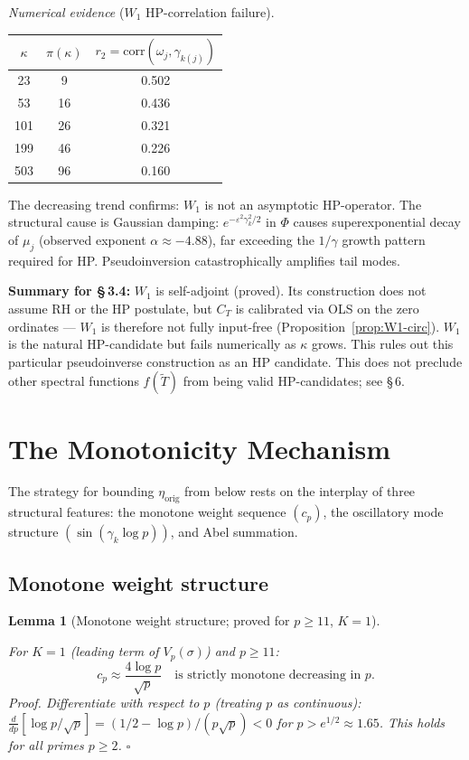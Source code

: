 \documentclass[11pt]{article}
\newtheorem{lemma}[theorem]{Lemma}
\newcommand{\etaorig}{\eta_{\mathrm{orig}}}
\newcommand{\Tt}{\widetilde{T}}
\newcommand{\CT}{C_{T}}
\newcommand{\Wone}{W_1}
\begin{document}
\emph{Numerical evidence} ($\Wone$ HP-correlation failure).

\begin{center}
\begin{tabular}{ccc}
\toprule
$\kappa$ & $\pi(\kappa)$ & $r_2 = \mathrm{corr}(\omega_j,\gamma_{k(j)})$ \\
\midrule
23  & 9  & 0.502 \\
53  & 16 & 0.436 \\
101 & 26 & 0.321 \\
199 & 46 & 0.226 \\
503 & 96 & 0.160 \\
\bottomrule
\end{tabular}
\end{center}

The decreasing trend confirms: $\Wone$ is not an asymptotic
HP-operator.
The structural cause is Gaussian damping: $e^{-\varepsilon^2\gamma_k^2/2}$
in $\Phi$ causes superexponential decay of $\mu_j$
(observed exponent $\alpha\approx -4.88$),
far exceeding the $1/\gamma$ growth pattern required for HP.
Pseudoinversion catastrophically amplifies tail modes.

\textbf{Summary for \S\,3.4:}
$\Wone$ is self-adjoint (proved).
Its construction does not assume RH or the HP postulate, but $\CT$
is calibrated via OLS on the zero ordinates --- $\Wone$ is therefore
not fully input-free (Proposition~\ref{prop:W1-circ}).
$\Wone$ is the natural HP-candidate but fails numerically as
$\kappa$ grows.
This rules out this particular pseudoinverse construction as an HP candidate.
This does not preclude other spectral functions $f(\Tt)$ from being valid
HP-candidates; see \S\,6.

\section{The Monotonicity Mechanism}

The strategy for bounding $\etaorig$ from below rests on the
interplay of three structural features:
the monotone weight sequence $(c_p)$,
the oscillatory mode structure $(\sin(\gamma_k\log p))$,
and Abel summation.

\subsection{Monotone weight structure}

\begin{lemma}[Monotone weight structure; proved for $p\geq 11$, $K=1$]\label{lem:M1}

For $K=1$ (leading term of $V_p(\sigma)$) and $p\geq 11$:
\[
c_p \approx \frac{4\log p}{\sqrt{p}}\quad\text{is strictly monotone
decreasing in } p.
\]
\emph{Proof.}
Differentiate with respect to $p$ (treating $p$ as continuous):
$\frac{d}{dp}[\log p/\sqrt{p}] = (1/2-\log p)/(p\sqrt{p}) < 0$
for $p > e^{1/2}\approx 1.65$.
This holds for all primes $p\geq 2$. $\square$
\end{lemma}
\end{document}
